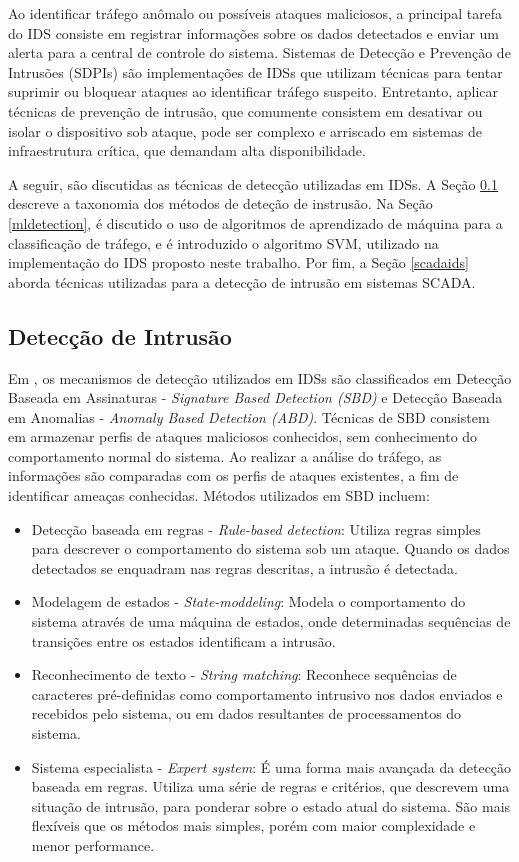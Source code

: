 \documentclass[cic,tc]{iiufrgs}
\begin{document}
Ao identificar tráfego anômalo ou possíveis ataques maliciosos, a principal tarefa do IDS consiste em registrar informações sobre os dados detectados e enviar um alerta para a central de controle do sistema. Sistemas de Detecção e Prevenção de Intrusões (SDPIs) são implementações de IDSs que utilizam técnicas para tentar suprimir ou bloquear ataques ao identificar tráfego suspeito. Entretanto, aplicar técnicas de prevenção de intrusão, que comumente consistem em desativar ou isolar o dispositivo sob ataque, pode ser complexo e arriscado em sistemas de infraestrutura crítica, que demandam alta disponibilidade.

A seguir, são discutidas as técnicas de detecção utilizadas em IDSs. A Seção \ref{detectiontec} descreve a taxonomia dos métodos de deteção de instrusão. Na Seção \ref{mldetection}, é discutido o uso de algoritmos de aprendizado de máquina para a classificação de tráfego, e é introduzido o algoritmo SVM, utilizado na implementação do IDS proposto neste trabalho. Por fim, a Seção \ref{scadaids} aborda técnicas utilizadas para a detecção de intrusão em sistemas SCADA.

\subsection{Detecção de Intrusão}
\label{detectiontec}
Em \cite{axelsson2000intrusion}, os mecanismos de detecção utilizados em IDSs são classificados em Detecção Baseada em Assinaturas - \emph{Signature Based Detection (SBD)} e Detecção Baseada em Anomalias - \emph{Anomaly Based Detection (ABD)}. Técnicas de SBD consistem em armazenar perfis de ataques maliciosos conhecidos, sem conhecimento do comportamento normal do sistema. Ao realizar a análise do tráfego, as informações são comparadas com os perfis de ataques existentes, a fim de identificar ameaças conhecidas. Métodos utilizados em SBD incluem:
\begin{itemize}
\item{Detecção baseada em regras - \emph{Rule-based detection}}: Utiliza regras simples para descrever o comportamento do sistema sob um ataque. Quando os dados detectados se enquadram nas regras descritas, a intrusão é detectada.
\item{Modelagem de estados - \emph{State-moddeling}}: Modela o comportamento do sistema através de uma máquina de estados, onde determinadas sequências de transições entre os estados identificam a intrusão.
\item{Reconhecimento de texto - \emph{String matching}}: Reconhece sequências de caracteres pré-definidas como  comportamento intrusivo nos dados enviados e recebidos pelo sistema, ou em dados resultantes de processamentos do sistema.
\item{Sistema especialista - \emph{Expert system}}: É uma forma mais avançada da detecção baseada em regras. Utiliza uma série de regras e critérios, que descrevem uma situação de intrusão, para ponderar sobre o estado atual do sistema. São mais flexíveis que os métodos mais simples, porém com maior complexidade e menor performance.
\end{itemize}
\end{document}
